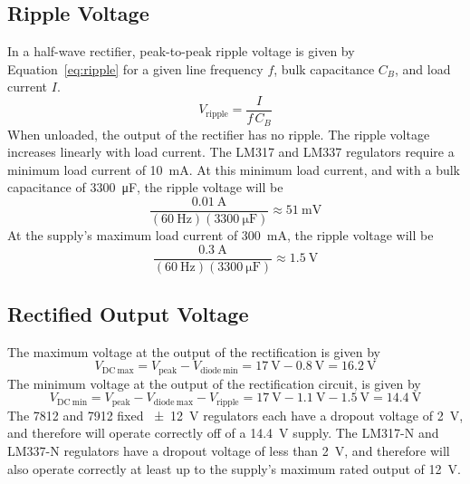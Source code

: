 \documentclass{article}
\begin{document}
\subsection{Ripple Voltage}
In a half-wave rectifier, peak-to-peak ripple voltage is given by 
Equation~\eqref{eq:ripple} for a given line frequency $f$, bulk capacitance 
$C_B$, and load current $I$.
\begin{equation}
    \label{eq:ripple}
    V_\mathrm{ripple} = \frac{I}{f \, C_B}
\end{equation}
When unloaded, the output of the rectifier has no ripple. The ripple voltage
increases linearly with load current.
%
The LM317 and LM337 regulators require a minimum load current of
\SI{10}{\milli\ampere}. At this minimum load current, and with a bulk
capacitance of \SI{3300}{\micro\farad}, the ripple voltage will be
%
\begin{displaymath}
  \frac{\SI{0.01}{\ampere}}{(\SI{60}{\hertz})(\SI{3300}{\micro\farad})}
  \approx \SI{51}{\milli\volt}
\end{displaymath}
%
At the supply's maximum load current of \SI{300}{\milli\ampere}, the ripple 
voltage will be
%
\begin{displaymath}
  \frac{\SI{0.3}{\ampere}}{(\SI{60}{\hertz})(\SI{3300}{\micro\farad})}
  \approx \SI{1.5}{\volt}
\end{displaymath}

\subsection{Rectified Output Voltage}
The maximum voltage at the output of the rectification is given by
%
\begin{displaymath}
  V_\mathrm{DC~max} = V_\mathrm{peak} - V_\mathrm{diode~min} = 
  \SI{17}{\volt} - \SI{0.8}{\volt} = \SI{16.2}{\volt}
\end{displaymath}
%
The minimum voltage at the output of the rectification circuit, is given by 
%
\begin{displaymath}
  V_\mathrm{DC~min} = V_\mathrm{peak} - V_\mathrm{diode~max} - 
  V_\mathrm{ripple} = \SI{17}{\volt} - \SI{1.1}{\volt} - \SI{1.5}{\volt} = 
  \SI{14.4}{\volt}
\end{displaymath}
%
The 7812 and 7912 fixed \SI{\pm 12}{\volt} regulators each have a dropout
voltage of \SI{2}{\volt}, and therefore will operate correctly off of a
\SI{14.4}{\volt} supply. The LM317-N and LM337-N regulators have a dropout 
voltage of less than \SI{2}{\volt}, and therefore will also operate
correctly at least up to the supply's maximum rated output of \SI{12}{\volt}.
\end{document}
